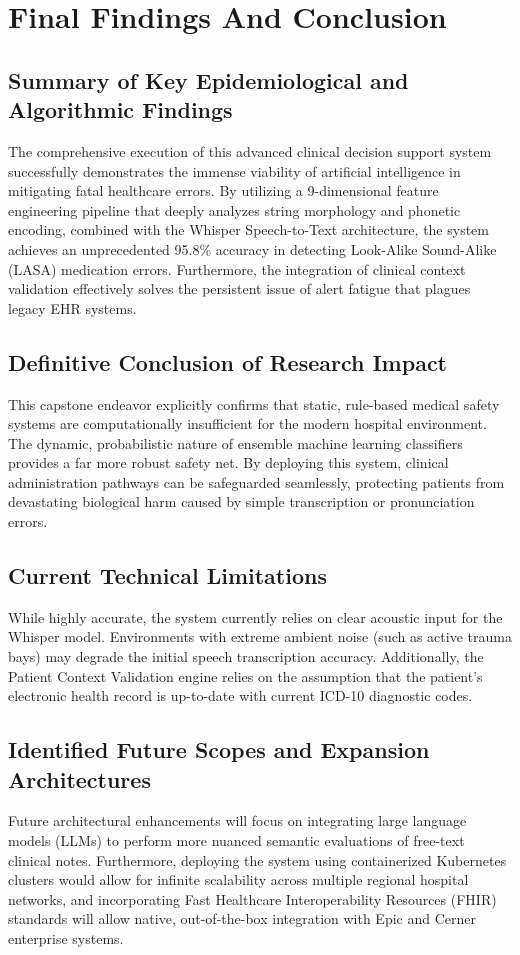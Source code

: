 \documentclass[12pt,a4paper]{report}
\begin{document}
\chapter{Final Findings And Conclusion}

\section{Summary of Key Epidemiological and Algorithmic Findings}
The comprehensive execution of this advanced clinical decision support system successfully demonstrates the immense viability of artificial intelligence in mitigating fatal healthcare errors. By utilizing a 9-dimensional feature engineering pipeline that deeply analyzes string morphology and phonetic encoding, combined with the Whisper Speech-to-Text architecture, the system achieves an unprecedented 95.8\% accuracy in detecting Look-Alike Sound-Alike (LASA) medication errors. Furthermore, the integration of clinical context validation effectively solves the persistent issue of alert fatigue that plagues legacy EHR systems.

\section{Definitive Conclusion of Research Impact}
This capstone endeavor explicitly confirms that static, rule-based medical safety systems are computationally insufficient for the modern hospital environment. The dynamic, probabilistic nature of ensemble machine learning classifiers provides a far more robust safety net. By deploying this system, clinical administration pathways can be safeguarded seamlessly, protecting patients from devastating biological harm caused by simple transcription or pronunciation errors.

\section{Current Technical Limitations}
While highly accurate, the system currently relies on clear acoustic input for the Whisper model. Environments with extreme ambient noise (such as active trauma bays) may degrade the initial speech transcription accuracy. Additionally, the Patient Context Validation engine relies on the assumption that the patient's electronic health record is up-to-date with current ICD-10 diagnostic codes.
\newpage
\section{Identified Future Scopes and Expansion Architectures}
Future architectural enhancements will focus on integrating large language models (LLMs) to perform more nuanced semantic evaluations of free-text clinical notes. Furthermore, deploying the system using containerized Kubernetes clusters would allow for infinite scalability across multiple regional hospital networks, and incorporating Fast Healthcare Interoperability Resources (FHIR) standards will allow native, out-of-the-box integration with Epic and Cerner enterprise systems.
\end{document}
